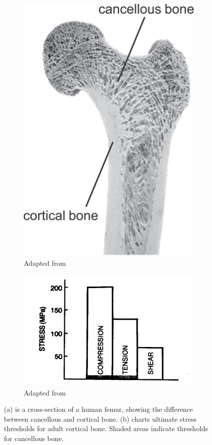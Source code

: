 \documentclass[titlepage]{article}
\begin{document}
\begin{figure}[h!]
\centering
\begin{subfigure}{.5\textwidth}
  \centering
  \includegraphics[width=.4\linewidth]{bone_microstructure}
  \caption{Adapted from \cite{cross-section}}
  \end{subfigure}%
\begin{subfigure}{.5\textwidth}
  \centering
  \includegraphics[width=.9\linewidth]{bone_stress}
  \caption{Adapted from \cite{stress}}
\end{subfigure}
\caption{(a) is a cross-section of a human femur, showing the difference between cancellous and cortical bone. (b) charts ultimate stress thresholds for adult cortical bone. Shaded areas indicate thresholds for cancellous bone.}
\label{fig:bone_struct}
\end{figure}
\end{document}
